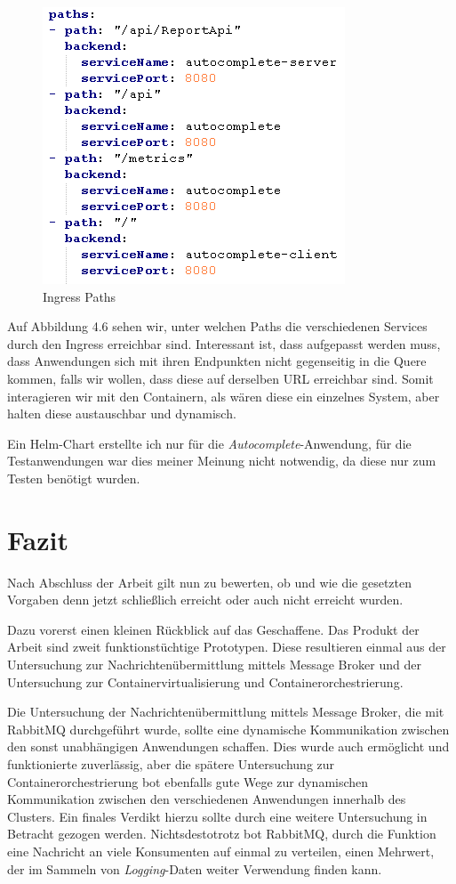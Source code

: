 \documentclass[12pt,a4paper]{scrartcl}
\begin{document}
\begin{figure}[h!]
	\centering
	\includegraphics[scale=1]{KubeIngressPaths.png}
	\caption[Ingress Paths]{Ingress Paths}
\end{figure}

Auf Abbildung 4.6 sehen wir, unter welchen Paths die verschiedenen Services durch den Ingress erreichbar sind. Interessant ist, dass aufgepasst werden muss, dass Anwendungen sich mit ihren Endpunkten nicht gegenseitig in die Quere kommen, falls wir wollen, dass diese auf derselben URL erreichbar sind. 
Somit interagieren wir mit den Containern, als wären diese ein einzelnes System, aber halten diese austauschbar und dynamisch.

Ein Helm-Chart erstellte ich nur für die \emph{Autocomplete}-Anwendung, für die Testanwendungen war dies meiner Meinung nicht notwendig, da diese nur zum Testen benötigt wurden.


\newpage
\section{Fazit}\label{conclusion}
Nach Abschluss der Arbeit gilt nun zu bewerten, ob und wie die gesetzten Vorgaben denn jetzt schließlich erreicht oder auch nicht erreicht wurden.

Dazu vorerst einen kleinen Rückblick auf das Geschaffene. Das Produkt der Arbeit sind zweit funktionstüchtige Prototypen. Diese resultieren einmal aus der Untersuchung zur Nachrichtenübermittlung mittels Message Broker und der Untersuchung zur Containervirtualisierung und Containerorchestrierung. 

Die Untersuchung der Nachrichtenübermittlung mittels Message Broker, die mit RabbitMQ durchgeführt wurde, sollte eine dynamische Kommunikation zwischen den sonst unabhängigen Anwendungen schaffen. Dies wurde auch ermöglicht und funktionierte zuverlässig, aber die spätere Untersuchung zur Containerorchestrierung bot ebenfalls gute Wege zur dynamischen Kommunikation zwischen den verschiedenen Anwendungen innerhalb des Clusters. Ein finales Verdikt hierzu sollte durch eine weitere Untersuchung in Betracht gezogen werden. Nichtsdestotrotz bot RabbitMQ, durch die Funktion eine Nachricht an viele Konsumenten auf einmal zu verteilen, einen Mehrwert, der im Sammeln von \emph{Logging}-Daten weiter Verwendung finden kann.
\end{document}
